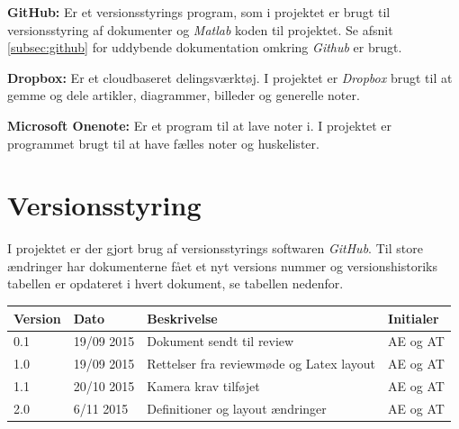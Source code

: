 \textbf{GitHub:} Er et versionsstyrings program, som i projektet er brugt til versionsstyring af dokumenter og \textit{Matlab} koden til projektet. Se afsnit \ref{subsec:github} for uddybende dokumentation omkring \textit{Github} er brugt.

\textbf{Dropbox:} Er et cloudbaseret delingsværktøj. I projektet er \textit{Dropbox} brugt til at gemme og dele artikler, diagrammer, billeder og generelle noter.

\textbf{Microsoft Onenote:} Er et program til at lave noter i. I projektet er programmet brugt til at have fælles noter og huskelister.

\newpage
\section{Versionsstyring}
I projektet er der gjort brug af versionsstyrings softwaren \textit{GitHub}. Til store ændringer har dokumenterne fået et nyt versions nummer og versionshistoriks tabellen er opdateret i hvert dokument, se tabellen nedenfor. 

\begin{center}
		\begin{longtable}{ | m{1.5cm} | m{2cm}| m{7cm}| m{2cm}| } 
			\hline
			\textbf{Version}  & \textbf{Dato} & \textbf{Beskrivelse} & \textbf{Initialer}  \\ 
			\hline
			0.1  &  19/09 2015  & Dokument sendt til review & AE og AT \\
			\hline
		1.0  &  19/09 2015  & Rettelser fra reviewmøde og Latex layout & AE og AT \\
		\hline
		1.1  &  20/10 2015  & Kamera krav tilføjet & AE og AT \\
		\hline
		2.0  &  6/11 2015  & Definitioner og layout ændringer & AE og AT \\
			\hline
		\end{longtable}
		
	\end{center}


